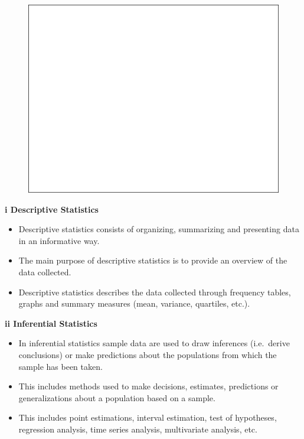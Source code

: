 \documentclass[]{book}
\providecommand{\tightlist}{%
  \setlength{\itemsep}{0pt}\setlength{\parskip}{0pt}}
\begin{document}
\begin{figure}

{\centering \includegraphics[width=1\linewidth]{figure/box1-1} 

}

\end{figure}

\textbf{i Descriptive Statistics}

\begin{itemize}
\tightlist
\item
  Descriptive statistics consists of organizing, summarizing and presenting data in an informative way.
\item
  The main purpose of descriptive statistics is to provide an overview of the data collected.
\item
  Descriptive statistics describes the data collected through frequency tables, graphs and summary measures (mean, variance, quartiles, etc.).
\end{itemize}

\textbf{ii Inferential Statistics}

\begin{itemize}
\tightlist
\item
  In inferential statistics sample data are used to draw inferences (i.e.~derive conclusions) or make predictions about the populations from which the sample has been taken.
\item
  This includes methods used to make decisions, estimates, predictions or generalizations about a population based on a sample.
\item
  This includes point estimations, interval estimation, test of hypotheses, regression analysis, time series analysis, multivariate analysis, etc.
\end{itemize}
\end{document}
